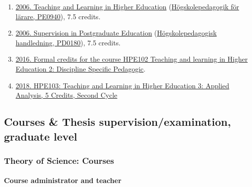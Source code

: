 \documentclass[
]{article}
\providecommand{\tightlist}{%
  \setlength{\itemsep}{0pt}\setlength{\parskip}{0pt}}
\begin{document}
\begin{enumerate}
\def\labelenumi{\arabic{enumi}.}
\tightlist
\item
  \href{http://files.christopherkullenberg.se/hogskolepedagogikonline.pdf}{2006.
  Teaching and Learning in Higher Education}
  (\href{http://files.christopherkullenberg.se/PE0940.pdf}{Högskolepedagogik
  för lärare, PE0940}), 7.5 credits.
\item
  \href{http://files.christopherkullenberg.se/hogskolepedagogikonline.pdf}{2006.
  Supervision in Postgraduate Education}
  (\href{http://files.christopherkullenberg.se/PD0180.pdf}{Högskolepedagogisk
  handledning, PD0180}), 7.5 credits.
\item
  \href{http://kursplaner.gu.se/svenska/HPE102.pdf}{2016. Formal credits
  for the course HPE102 Teaching and learning in Higher Education 2:
  Discipline Specific Pedagogic}.
\item
  \href{http://kursplaner.gu.se/svenska/HPE103.pdf}{2018. HPE103:
  Teaching and Learning in Higher Education 3: Applied Analysis, 5
  Credits, Second Cycle}
\end{enumerate}

\hypertarget{courses-thesis-supervisionexamination-graduate-level}{%
\subsection{Courses \& Thesis supervision/examination, graduate
level}\label{courses-thesis-supervisionexamination-graduate-level}}

\hypertarget{theory-of-science-courses}{%
\subsubsection{Theory of Science:
Courses}\label{theory-of-science-courses}}

\hypertarget{course-administrator-and-teacher}{%
\paragraph{Course administrator and
teacher}\label{course-administrator-and-teacher}}
\end{document}
